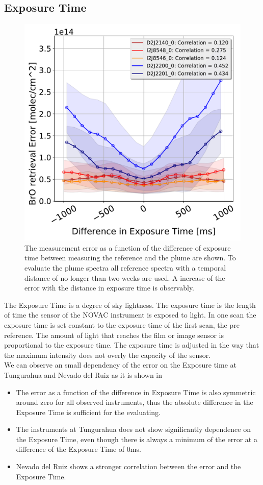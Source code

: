 \subsection{Exposure Time}
\begin{figure}
	\centering
	\includegraphics[width=0.7\linewidth]{Bilder/DiffExpTimeallInstruments}
	\caption{The   measurement error as a function of the difference of exposure time between measuring the reference and the plume are shown. To evaluate the plume spectra all reference spectra with a temporal distance of no longer than two weeks are used. A increase of the  error with the distance in exposure time is observably.}
	\label{fig:diffexptime}
\end{figure}
The Exposure Time is a degree of sky lightness. The  exposure time is the length of time the sensor of the NOVAC instrument is exposed to light. In one scan the exposure time is set constant to the exposure time of the first scan, the pre reference. The amount of light that reaches the film or image sensor is proportional to the exposure time. The exposure time is adjusted in the way that the maximum intensity does not overly the capacity of the sensor.\\
We can observe an small dependency of the  error on the Exposure time at Tungurahua and Nevado del Ruiz as it is shown in 
\begin{itemize}
	\item The   error as a function of the difference in Exposure Time is also symmetric around zero for all observed instruments, thus the absolute difference in the Exposure Time is sufficient for the evaluating.
	\item The instruments at Tungurahua does not show significantly dependence on the Exposure Time, even though there is always a minimum of the  error at a difference of the Exposure Time of 0ms.
	\item Nevado del Ruiz shows a stronger correlation between the   error and the Exposure Time.
\end{itemize}
